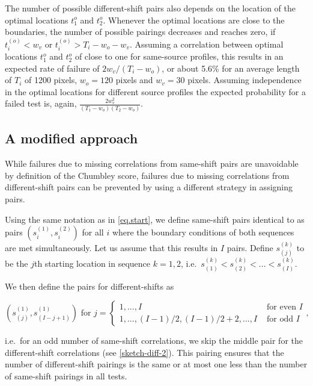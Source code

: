 \documentclass[12pt]{article}
\begin{document}
The number of possible different-shift pairs also depends on the
location of the optimal locations \(t_1^o\) and \(t_2^o\). Whenever the
optimal locations are close to the boundaries, the number of possible
pairings decreases and reaches zero, if \(t_i^{(o)} < w_v\) or
\(t_i^{(o)} > T_i-w_o- w_v\). Assuming a correlation between optimal
locations \(t_1^o\) and \(t_2^o\) of close to one for same-source
profiles, this results in an expected rate of failure of
\(2 w_v / (T_i-w_o)\), or about 5.6\% for an average length of \(T_i\)
of 1200 pixels, \(w_o = 120\) pixels and \(w_v = 30\) pixels. Assuming
independence in the optimal locations for different source profiles the
expected probability for a failed test is, again,
\(\frac{2 w_v^2}{(T_1-w_o)(T_2-w_o)}\).

\subsection{A modified approach}\label{a-modified-approach}

While failures due to missing correlations from same-shift pairs are
unavoidable by definition of the Chumbley score, failures due to missing
correlations from different-shift pairs can be prevented by using a
different strategy in assigning pairs.

Using the same notation as in \autoref{eq.start}, we define same-shift
pairs identical to \citet{hadler} as pairs \((s_i^{(1)}, s_i^{(2)})\)
for all \(i\) where the boundary conditions of both sequences are met
simultaneously. Let us assume that this results in \(I\) pairs. Define
\(s_{(j)}^{(k)}\) to be the \(j\)th starting location in sequence
\(k = 1, 2\),
i.e.~\(s_{(1)}^{(k)} < s_{(2)}^{(k)} < ... < s_{(I)}^{(k)}\).

We then define the pairs for different-shifts as

\begin{equation}\label{eq.diff2}
\left(s_{(j)}^{(1)}, s_{(I-j+1)}^{(1)} \right) \text{ for } j = 
\begin{cases}
1, ..., I & \text{ for even } I \\
1, ..., (I-1)/2, (I-1)/2 + 2, ..., I & \text{ for odd } I
\end{cases},
\end{equation}

i.e.~for an odd number of same-shift correlations, we skip the middle
pair for the different-shift correlations (see \autoref{sketch-diff-2}).
This pairing ensures that the number of different-shift pairings is the
same or at most one less than the number of same-shift pairings in all
tests.
\end{document}
